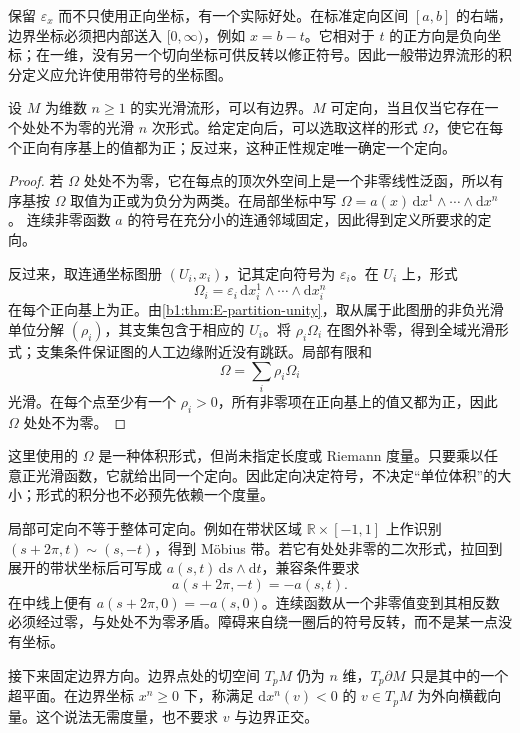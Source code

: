 \ProseParagraphBreak

保留 \(\varepsilon_x\) 而不只使用正向坐标，有一个实际好处。在标准定向区间 \([a,b]\) 的右端，边界坐标必须把内部送入 \([0,\infty)\)，例如 \(x=b-t\)。它相对于 \(t\) 的正方向是负向坐标；在一维，没有另一个切向坐标可供反转以修正符号。因此一般带边界流形的积分定义应允许使用带符号的坐标图。

\begin{proposition}\label{b1:prop:E-orientation-volume}
设 \(M\) 为维数 \(n\geq1\) 的实光滑流形，可以有边界。\(M\) 可定向，当且仅当它存在一个处处不为零的光滑 \(n\) 次形式。给定定向后，可以选取这样的形式 \(\Omega\)，使它在每个正向有序基上的值都为正；反过来，这种正性规定唯一确定一个定向。
\end{proposition}
\begin{proof}
若 \(\Omega\) 处处不为零，它在每点的顶次外空间上是一个非零线性泛函，所以有序基按 \(\Omega\) 取值为正或为负分为两类。在局部坐标中写
\(\Omega=a(x)\,\mathrm dx^1\wedge\cdots\wedge\mathrm dx^n\)。
连续非零函数 \(a\) 的符号在充分小的连通邻域固定，因此得到定义所要求的定向。

反过来，取连通坐标图册 \((U_i,x_i)\)，记其定向符号为 \(\varepsilon_i\)。在 \(U_i\) 上，形式
\[
 \Omega_i=\varepsilon_i\,
      \mathrm dx_i^1\wedge\cdots\wedge\mathrm dx_i^n
\]
在每个正向基上为正。由\cref{b1:thm:E-partition-unity}，取从属于此图册的非负光滑单位分解 \((\rho_i)\)，其支集包含于相应的 \(U_i\)。将 \(\rho_i\Omega_i\) 在图外补零，得到全域光滑形式；支集条件保证图的人工边缘附近没有跳跃。局部有限和
\[
 \Omega=\sum_i\rho_i\Omega_i
\]
光滑。在每个点至少有一个 \(\rho_i>0\)，所有非零项在正向基上的值又都为正，因此 \(\Omega\) 处处不为零。
\end{proof}

这里使用的 \(\Omega\) 是一种体积形式，但尚未指定长度或 Riemann 度量。只要乘以任意正光滑函数，它就给出同一个定向。因此定向决定符号，不决定“单位体积”的大小；形式的积分也不必预先依赖一个度量。

\ProseParagraphBreak

局部可定向不等于整体可定向。例如在带状区域
\(\mathbb R\times[-1,1]\) 上作识别
\((s+2\pi,t)\sim(s,-t)\)，得到 Möbius 带。若它有处处非零的二次形式，拉回到展开的带状坐标后可写成
\(a(s,t)\,\mathrm ds\wedge\mathrm dt\)，兼容条件要求
\[
 a(s+2\pi,-t)=-a(s,t).
\]
在中线上便有 \(a(s+2\pi,0)=-a(s,0)\)。连续函数从一个非零值变到其相反数必须经过零，与处处不为零矛盾。障碍来自绕一圈后的符号反转，而不是某一点没有坐标。

\ProseParagraphBreak

接下来固定边界方向。边界点处的切空间 \(T_pM\) 仍为 \(n\) 维，\(T_p\partial M\) 只是其中的一个超平面。在边界坐标 \(x^n\geq0\) 下，称满足
\(\mathrm dx^n(v)<0\) 的 \(v\in T_pM\) 为外向横截向量。这个说法无需度量，也不要求 \(v\) 与边界正交。

